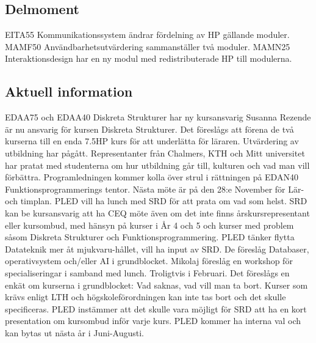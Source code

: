 \documentclass{article}
\begin{document}
	\subsection{Delmoment}
	EITA55 Kommunikationssystem ändrar fördelning av HP gällande moduler.\newline
	MAMF50 Användbarhetsutvärdering sammanställer två moduler.\newline
	MAMN25 Interaktionsdesign har en ny modul med redistributerade HP till modulerna.
	
	\subsection{Aktuell information}
	
	EDAA75 och EDAA40 Diskreta Strukturer har ny kursansvarig Susanna Rezende är nu ansvarig för kursen Diskreta Strukturer. Det föreslågs att förena de två kurserna till en enda 7.5HP kurs för att underlätta för läraren.\newline
	Utvärdering av utbildning har pågått. Representanter från Chalmers, KTH och Mitt universitet har pratat med studenterna om hur utbildning går till, kulturen och vad man vill förbättra.\newline
	Programledningen kommer kolla över strul i rättningen på EDAN40 Funktionsprogrammerings tentor.\newline
	Nästa möte är på den 28:e November för Lär- och timplan.\newline
	PLED vill ha lunch med SRD för att prata om vad som helst.\newline	
	SRD kan be kursansvarig att ha CEQ möte även om det inte finns årskursrepresentant eller kursombud, med hänsyn på kurser i År 4 och 5 och kurser med problem såsom Diskreta Strukturer och Funktionsprogrammering.\newline
	PLED tänker flytta Datateknik mer åt mjukvaru-hållet, vill ha input av SRD. De föreslåg Databaser, operativsystem och/eller AI i grundblocket.\newline
	Mikolaj föreslåg en workshop för specialiseringar i samband med lunch. Troligtvis i Februari.\newline
	Det föreslågs en enkät om kurserna i grundblocket: Vad saknas, vad vill man ta bort. Kurser som krävs enligt LTH och högskoleförordningen kan inte tas bort och det skulle specificeras.\newline
	PLED instämmer att det skulle vara möjligt för SRD att ha en kort presentation om kursombud inför varje kurs.\newline
	PLED kommer ha interna val och kan bytas ut nästa år i Juni-Augusti.
	
	
\end{document}
